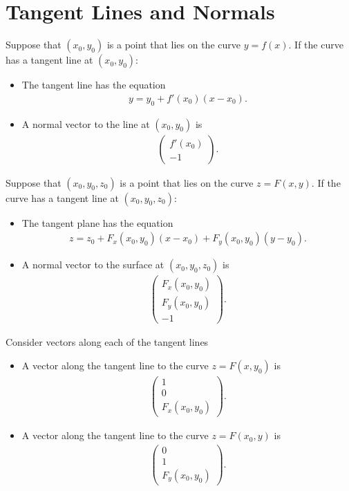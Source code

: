 \documentclass{report}
\newcommand{\cvec}[1]{ \begin{pmatrix} #1 \end{pmatrix} }
\begin{document}
	\section{Tangent Lines and Normals}

		Suppose that $(x_0,y_0)$ is a point that lies on the curve $y = f(x)$. If the curve has a tangent line at $(x_0,y_0)$:
		\begin{itemize}
			\item The tangent line has the equation
				\begin{align*}
					y = y_0 + f'(x_0)(x - x_0).
				\end{align*}
			\item A normal vector to the line at $(x_0,y_0)$ is
				\begin{align*}
					\cvec{f'(x_0)\\-1}.
				\end{align*}
		\end{itemize}

		Suppose that $(x_0,y_0,z_0)$ is a point that lies on the curve $z = F(x,y)$. If the curve has a tangent line at $(x_0,y_0,z_0)$:
		\begin{itemize}
			\item The tangent plane has the equation
				\begin{align*}
					z = z_0 + F_x(x_0,y_0)(x - x_0) + F_y(x_0,y_0)(y - y_0).
				\end{align*}
			\item A normal vector to the surface at $(x_0,y_0,z_0)$ is
				\begin{align*}
					\cvec{F_x(x_0,y_0)\\F_y(x_0,y_0)\\-1}.
				\end{align*}
		\end{itemize}

		Consider vectors along each of the tangent lines
		\begin{itemize}
			\item A vector along the tangent line to the curve $z = F(x,y_0)$ is 
				\begin{align*}
					\cvec{1\\0\\F_x(x_0,y_0)}.
				\end{align*}
			\item A vector along the tangent line to the curve $z = F(x_0,y)$ is 
				\begin{align*}
					\cvec{0\\1\\F_y(x_0,y_0)}.
				\end{align*}
		\end{itemize}
\end{document}
